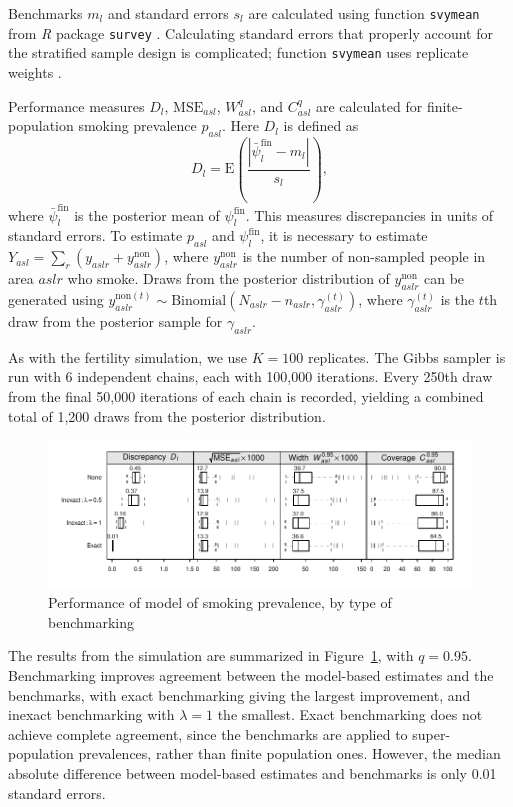 \documentclass[12pt]{article}
\let\proglang=\textit
\let\code=\texttt
\begin{document}
Benchmarks $m_l$ and standard errors $s_l$ are calculated using function \code{svymean} from \proglang{R} package \code{survey} \citep{lumley2004analysis}.  Calculating standard errors that properly account for the stratified sample design is complicated; function \code{svymean} uses replicate weights \citep[][p. 32]{lumley2011complex}.

Performance measures $D_l$, $\text{MSE}_{asl}$, $W_{asl}^q$, and $C_{asl}^q$ are calculated for finite-population smoking prevalence $p_{asl}$.
Here $D_l$ is defined as
\begin{equation}
  D_l =  \text{E}\left( \frac{ | \bar{\psi}_l^{\text{fin}} - m_l | }{ s_l }\right),  \label{eq:defn_agree2}
\end{equation}
where $\bar{\psi}_l^{\text{fin}}$ is the posterior mean of $\psi_l^{\text{fin}}$.  This measures discrepancies in units of standard errors.
To estimate $p_{asl}$ and $\psi_l^{\text{fin}}$, it is necessary to estimate $Y_{asl} = \sum_r (y_{aslr} + y_{aslr}^{\text{non}})$, where $y_{aslr}^{\text{non}}$ is the number of non-sampled people in area $aslr$ who smoke.  Draws from the posterior distribution of $y_{aslr}^{\text{non}}$ can be generated using $y_{aslr}^{\text{non} (t)} \sim \text{Binomial}(N_{aslr} - n_{aslr}, \gamma_{aslr}^{(t)})$, where $\gamma_{aslr}^{(t)}$ is the $t$th draw from the posterior sample for $\gamma_{aslr}$.

As with the fertility simulation, we use $K = 100$ replicates.  The Gibbs sampler is run with 6 independent chains, each with 100,000 iterations. Every 250th draw from the final 50,000 iterations of each chain is recorded, yielding a combined total of 1,200 draws from the posterior distribution.

\begin{figure}
  \center
    \includegraphics{smoking/smoking_performance}
  \caption{\small Performance of model of smoking prevalence, by type of benchmarking}
  \label{fig:smoking_performance}
\end{figure}

The results from the simulation are summarized in Figure~\ref{fig:smoking_performance}, with $q=0.95$.  Benchmarking improves agreement between the model-based estimates and the benchmarks, with exact benchmarking giving the largest improvement, and inexact benchmarking with $\lambda=1$ the smallest.  Exact benchmarking does not achieve complete agreement, since the benchmarks are applied to super-population prevalences, rather than finite population ones.  However, the median absolute difference between model-based estimates and benchmarks is only 0.01 standard errors.
\end{document}
